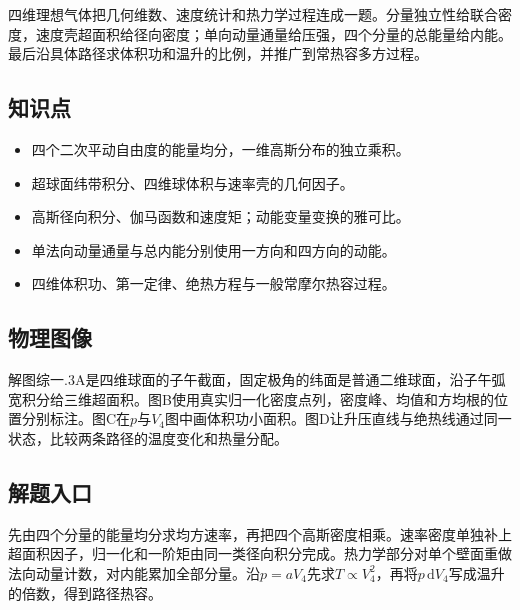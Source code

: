 \documentclass[UTF8,fontset=fandol,a4paper,11pt]{ctexart}
\begin{document}
四维理想气体把几何维数、速度统计和热力学过程连成一题。分量独立性给联合密度，速度壳超面积给径向密度；单向动量通量给压强，四个分量的总能量给内能。最后沿具体路径求体积功和温升的比例，并推广到常热容多方过程。



\subsection*{知识点}

\begin{itemize}
\item 四个二次平动自由度的能量均分，一维高斯分布的独立乘积。
\item 超球面纬带积分、四维球体积与速率壳的几何因子。
\item 高斯径向积分、伽马函数和速度矩；动能变量变换的雅可比。
\item 单法向动量通量与总内能分别使用一方向和四方向的动能。
\item 四维体积功、第一定律、绝热方程与一般常摩尔热容过程。
\end{itemize}



\subsection*{物理图像}

解图综一.3A是四维球面的子午截面，固定极角的纬面是普通二维球面，沿子午弧宽积分给三维超面积。图B使用真实归一化密度点列，密度峰、均值和方均根的位置分别标注。图C在$p$与$V_4$图中画体积功小面积。图D让升压直线与绝热线通过同一状态，比较两条路径的温度变化和热量分配。



\subsection*{解题入口}

先由四个分量的能量均分求均方速率，再把四个高斯密度相乘。速率密度单独补上超面积因子，归一化和一阶矩由同一类径向积分完成。热力学部分对单个壁面重做法向动量计数，对内能累加全部分量。沿$p=aV_4$先求$T\propto V_4^2$，再将$p\,\mathrm dV_4$写成温升的倍数，得到路径热容。

\end{document}
